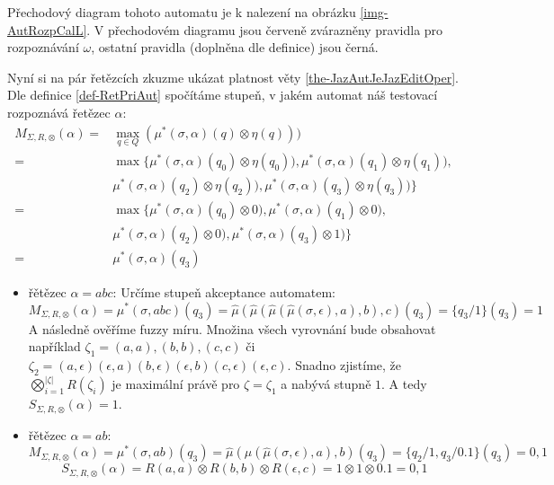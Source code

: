 \documentclass[a4paper,10pt]{article}
\begin{document}
\begin{example}
 Přechodový diagram tohoto automatu je k nalezení na obrázku \ref{img-AutRozpCalL}. V přechodovém diagramu jsou červeně zvárazněny pravidla pro rozpoznávání $\omega$, ostatní pravidla (doplněna dle definice) jsou černá. 
 
 Nyní si na pár řetězcích zkuzme ukázat platnost věty \ref{the-JazAutJeJazEditOper}. Dle definice \ref{def-RetPriAut} spočítáme stupeň, v jakém automat náš testovací rozpoznává řetězec $\alpha$:
 \begin{align*}
  M_{\Sigma, R, \otimes}(\alpha) 
   =& \max_{q \in Q} (\mu^*(\sigma, \alpha)(q) \otimes \eta(q))) \\
   =& \max\{ \mu^*(\sigma, \alpha)(q_0) \otimes \eta(q_0)), \mu^*(\sigma, \alpha)(q_1) \otimes \eta(q_1)),  \\
    & \mu^*(\sigma, \alpha)(q_2) \otimes \eta(q_2)), \mu^*(\sigma, \alpha)(q_3) \otimes \eta(q_3)) \}   \\
   =& \max\{ \mu^*(\sigma, \alpha)(q_0) \otimes 0), \mu^*(\sigma, \alpha)(q_1) \otimes 0),  \\
    & \mu^*(\sigma, \alpha)(q_2) \otimes 0), \mu^*(\sigma, \alpha)(q_3) \otimes 1) \}   \\
   =&  \mu^*(\sigma, \alpha)(q_3)
 \end{align*}
  
 \begin{itemize}
  \item řětězec $\alpha = abc$:
  Určíme stupeň akceptance automatem:
  $$
  M_{\Sigma, R, \otimes}(\alpha) 
   = \mu^*(\sigma, abc) (q_3)
   = \widehat{\mu}(\widehat{\mu}(\widehat{\mu}(\widehat{\mu}(\sigma, \epsilon), a), b), c) (q_3)
   = \{ q_3 / 1 \} (q_3) 
   = 1 
  $$
  A následně ověříme fuzzy míru. Množina všech vyrovnání bude obsahovat například $\zeta_1 = (a,a), (b,b), (c,c)$ či 
  $\zeta_2 = (a, \epsilon) (\epsilon, a) (b, \epsilon) (\epsilon, b) (c, \epsilon) (\epsilon, c)$. Snadno zjistíme, že $\bigotimes_{i = 1}^{|\zeta|} R(\zeta_i) $ je maximální právě pro $\zeta = \zeta_1$ a nabývá stupně $1$. A tedy $S_{\Sigma, R, \otimes}(\alpha) = 1$.
   
  \item řětězec $\alpha = ab$:
  $$
  M_{\Sigma, R, \otimes}(\alpha) 
   = \mu^*(\sigma, ab) (q_3)
   = \widehat{\mu}(\widehat{\mu}(\widehat{\mu}(\sigma, \epsilon), a), b) (q_3)
   = \{ q_2 / 1, q_3 / 0.1 \} (q_3)
   = 0,1
  $$
  $$
  S_{\Sigma, R, \otimes}(\alpha) 
   = R(a, a) \otimes R(b, b) \otimes R(\epsilon, c) 
   = 1 \otimes 1 \otimes 0.1
   = 0,1
  $$
  

\end{itemize}
\end{example}
\end{document}
